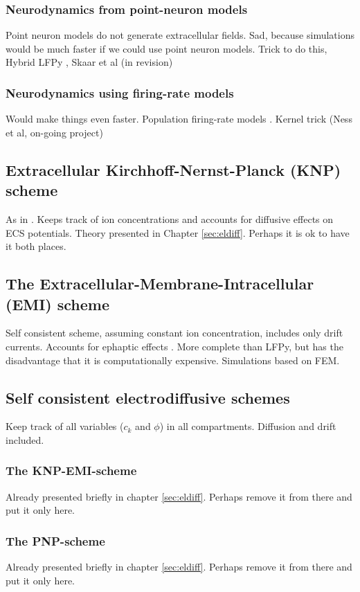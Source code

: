 \subsubsection{Neurodynamics from point-neuron models}
Point neuron models do not generate extracellular fields. Sad, because simulations would be much faster if we could use point neuron models. Trick to do this, Hybrid LFPy \citep{Hagen2016}, Skaar et al (in revision)

\subsubsection{Neurodynamics using firing-rate models}
Would make things even faster. Population firing-rate models  \citep{Hagen2016}. Kernel trick (Ness et al, on-going project) 


\subsection{Extracellular Kirchhoff-Nernst-Planck (KNP) scheme}
As in \cite{Solbra2018}. Keeps track of ion concentrations and accounts for diffusive effects on ECS potentials. Theory presented in Chapter \ref{sec:eldiff}. Perhaps it is ok to have it both places. 


\subsection{The Extracellular-Membrane-Intracellular (EMI) scheme}
Self consistent scheme, assuming constant ion concentration, includes only drift currents. Accounts for ephaptic effects \cite{Tveito2019}. More complete than LFPy, but has the disadvantage that it is computationally expensive. Simulations based on FEM.


\subsection{Self consistent electrodiffusive schemes}
Keep track of all variables ($c_k$ and $\phi$) in all compartments. Diffusion and drift included. 

\subsubsection{The KNP-EMI-scheme}
Already presented briefly in chapter \ref{sec:eldiff}. Perhaps remove it from there and put it only here. 

\subsubsection{The PNP-scheme}
Already presented briefly in chapter \ref{sec:eldiff}. Perhaps remove it from there and put it only here. 

